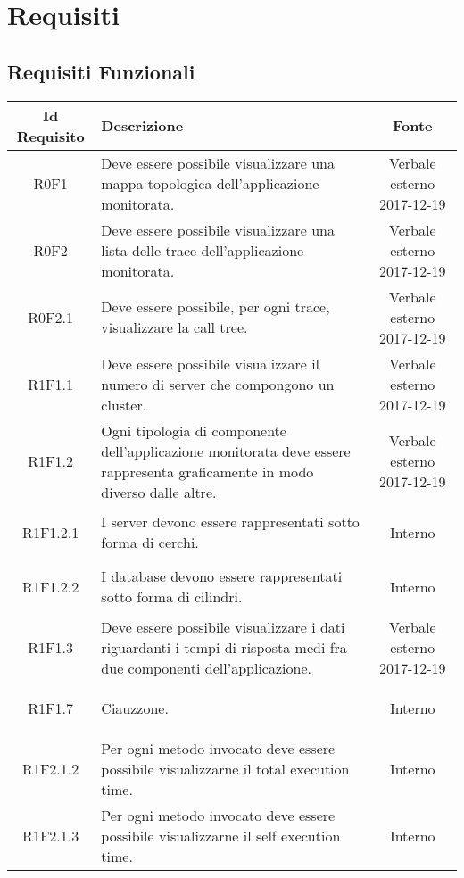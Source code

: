 \section{Requisiti}
\subsection{Requisiti Funzionali}
\normalsize
\begin{longtable}{|c|>{\centering}m{7cm}|c|}
\hline
\textbf{Id Requisito} & \textbf{Descrizione} & \textbf{Fonte}\\
\hline
\endhead
\hypertarget{R0F1}{R0F1} & Deve essere possibile visualizzare una mappa topologica dell'applicazione monitorata. & Verbale esterno 2017-12-19 \\ \hline 
\hypertarget{R0F2}{R0F2} & Deve essere possibile visualizzare una lista delle trace dell'applicazione monitorata.
 & Verbale esterno 2017-12-19 \\ \hline 
\hypertarget{R0F2.1}{R0F2.1} & Deve essere possibile, per ogni trace, visualizzare la call tree. & Verbale esterno 2017-12-19 \\ \hline 
\hypertarget{R1F1.1}{R1F1.1} & Deve essere possibile visualizzare il numero di server che compongono un cluster. & Verbale esterno 2017-12-19 \\ \hline 
\hypertarget{R1F1.2}{R1F1.2} & Ogni tipologia di componente dell'applicazione monitorata deve essere rappresenta graficamente in modo diverso dalle altre. & Verbale esterno 2017-12-19 \\ \hline 
\hypertarget{R1F1.2.1}{R1F1.2.1} & I server devono essere rappresentati sotto forma di cerchi. & Interno \\ \hline 
\hypertarget{R1F1.2.2}{R1F1.2.2} & I database devono essere rappresentati sotto forma di cilindri. & Interno \\ \hline 
\hypertarget{R1F1.3}{R1F1.3} & Deve essere possibile visualizzare i dati riguardanti i tempi di risposta medi fra due componenti dell'applicazione. & Verbale esterno 2017-12-19 \\ \hline 
\hypertarget{R1F1.7}{R1F1.7} & Ciauzzone. & Interno \\ \hline 
\hypertarget{R1F2.1.2}{R1F2.1.2} & Per ogni metodo invocato deve essere possibile visualizzarne il total execution time. & Interno \\ \hline 
\hypertarget{R1F2.1.3}{R1F2.1.3} & Per ogni metodo invocato deve essere possibile visualizzarne il self execution time. & Interno \\ \hline 

\end{longtable}
